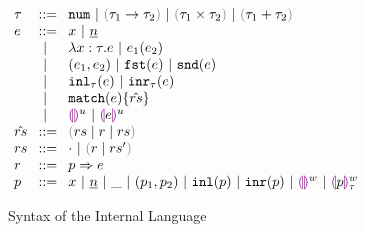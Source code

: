 
\begin{figure}[ht]
  $\arraycolsep=4pt\begin{array}{lll}
    \tau & ::= &
      \tnum ~\vert~
      \tarr{\tau_1}{\tau_2} ~\vert~
      \tprod{\tau_1}{\tau_2} ~\vert~
      \tsum{\tau_1}{\tau_2} \\
    e & ::= &
      x ~\vert~
      \hnum{n} \\
      & ~\vert~ &
      \hlam{x}{\tau}{e} ~\vert~
      \hap{e_1}{e_2} \\
      & ~\vert~ &
      \hpair{e_1}{e_2} ~\vert~
      \hfst{e} ~\vert~ \hsnd{e} \\
      & ~\vert~ &
      \hinl{\tau}{e} ~\vert~
      \hinr{\tau}{e} \\
      & ~\vert~ &
      \hmatch{e}{\hat{rs}} \\
      & ~\vert~ &
      \hehole{u} ~\vert~
      \hhole{e}{u} \\
    \hat{rs} & ::= &
      \zrulsP{rs}{r}{rs} \\
    rs & ::= &
      \cdot ~\vert~ \hrulesP{r}{rs'} \\
    r & ::= &
      \hrul{p}{e} \\
    p & ::= &
      x ~\vert~
      \hnum{n} ~\vert~
      \_ ~\vert~
      \hpair{p_1}{p_2} ~\vert~
      \hinlp{p} ~\vert~
      \hinrp{p} ~\vert~
      \heholep{w} ~\vert~
      \hholep{p}{w}{\tau}
    \end{array}$
\caption{Syntax of the Internal Language}
\label{fig:syntax}
\end{figure}

